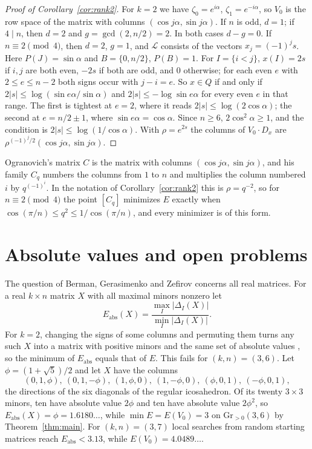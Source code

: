 \documentclass[11pt]{article}
\theoremstyle{remark}
\newcommand{\Gr}{\mathrm{Gr}}
\begin{document}
\begin{proof}[Proof of Corollary~\ref{cor:rank2}]
For $k=2$ we have $\zeta_0=e^{i\alpha}$, $\zeta_1=e^{-i\alpha}$, so $V_0$ is the row space of the matrix with columns $(\cos j\alpha,\sin j\alpha)$. If $n$ is odd, $d=1$; if $4\mid n$, then $d=2$ and $g=\gcd(2,n/2)=2$. In both cases $d-g=0$. If $n\equiv2\pmod4$, then $d=2$, $g=1$, and $\mathcal{L}$ consists of the vectors $x_j=(-1)^js$. Here $P(J)=\sin\alpha$ and $B=\{0,n/2\}$, $P(B)=1$. For $I=\{i<j\}$, $x(I)=2s$ if $i,j$ are both even, $-2s$ if both are odd, and $0$ otherwise; for each even $e$ with $2\le e\le n-2$ both signs occur with $j-i=e$. So $x\in Q$ if and only if $2|s|\le\log(\sin e\alpha/\sin\alpha)$ and $2|s|\le-\log\sin e\alpha$ for every even $e$ in that range. The first is tightest at $e=2$, where it reads $2|s|\le\log(2\cos\alpha)$; the second at $e=n/2\pm1$, where $\sin e\alpha=\cos\alpha$. Since $n\ge6$, $2\cos^2\alpha\ge1$, and the condition is $2|s|\le\log(1/\cos\alpha)$. With $\rho=e^{2s}$ the columns of $V_0\cdot D_x$ are $\rho^{(-1)^j/2}(\cos j\alpha,\sin j\alpha)$.
\end{proof}

Ogranovich's matrix $C$ \cite[(1.2)]{O} is the matrix with columns $(\cos j\alpha,\sin j\alpha)$, and his family $C_q$ \cite[Proposition~3.6]{O} numbers the columns from $1$ to $n$ and multiplies the column numbered $i$ by $q^{(-1)^i}$. In the notation of Corollary~\ref{cor:rank2} this is $\rho=q^{-2}$, so for $n\equiv2\pmod4$ the point $[C_q]$ minimizes $E$ exactly when $\cos(\pi/n)\le q^2\le1/\cos(\pi/n)$, and every minimizer is of this form.

\section{Absolute values and open problems}\label{sec:open}

The question of Berman, Gerasimenko and Zefirov concerns all real matrices. For a real $k\times n$ matrix $X$ with all maximal minors nonzero let
\[
E_{\mathrm{abs}}(X)=\frac{\max_I|\Delta_I(X)|}{\min_I|\Delta_I(X)|}.
\]
For $k=2$, changing the signs of some columns and permuting them turns any such $X$ into a matrix with positive minors and the same set of absolute values \cite[Proposition~2.14]{O}, so the minimum of $E_{\mathrm{abs}}$ equals that of $E$. This fails for $(k,n)=(3,6)$. Let $\phi=(1+\sqrt5)/2$ and let $X$ have the columns
\[
(0,1,\phi),\ (0,1,-\phi),\ (1,\phi,0),\ (1,-\phi,0),\ (\phi,0,1),\ (-\phi,0,1),
\]
the directions of the six diagonals of the regular icosahedron. Of its twenty $3\times3$ minors, ten have absolute value $2\phi$ and ten have absolute value $2\phi^2$, so $E_{\mathrm{abs}}(X)=\phi=1.6180\dots$, while $\min E=E(V_0)=3$ on $\Gr_{>0}(3,6)$ by Theorem~\ref{thm:main}. For $(k,n)=(3,7)$ local searches from random starting matrices reach $E_{\mathrm{abs}}<3.13$, while $E(V_0)=4.0489\dots$.
\end{document}
